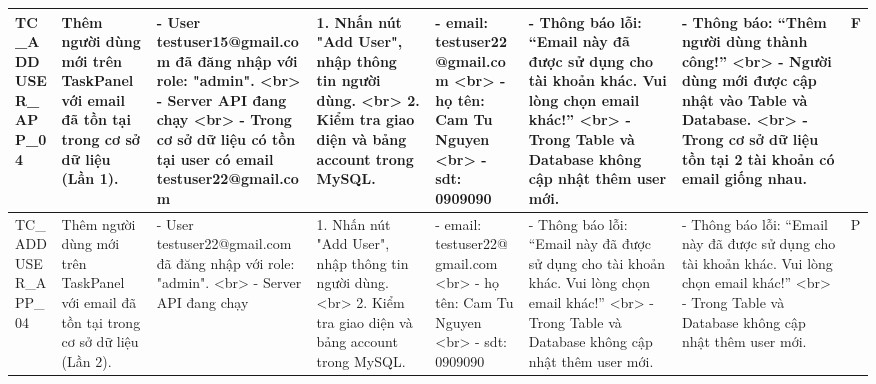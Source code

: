 \documentclass[a4paper,12pt]{article}
\begin{document}
\begin{longtable}{|p{2cm}|p{3cm}|p{3cm}|p{4cm}|p{3cm}|p{3cm}|p{3cm}|p{2cm}|}
    TC_ADDUSER_APP_04 & Thêm người dùng mới trên TaskPanel với email đã tồn tại trong cơ sở dữ liệu (Lần 1). & - User testuser15@gmail.com đã đăng nhập với role: "admin". <br> - Server API đang chạy <br> - Trong cơ sở dữ liệu có tồn tại user có email testuser22@gmail.com & 1. Nhấn nút "Add User", nhập thông tin người dùng. <br> 2. Kiểm tra giao diện và bảng account trong MySQL. & - email: testuser22@gmail.com <br> - họ tên: Cam Tu Nguyen <br> - sdt: 0909090 & - Thông báo lỗi: “Email này đã được sử dụng cho tài khoản khác. Vui lòng chọn email khác!” <br> - Trong Table và Database không cập nhật thêm user mới. & - Thông báo: “Thêm người dùng thành công!” <br> - Người dùng mới được cập nhật vào Table và Database. <br> - Trong cơ sở dữ liệu tồn tại 2 tài khoản có email giống nhau. & F \\ \hline
    TC_ADDUSER_APP_04 & Thêm người dùng mới trên TaskPanel với email đã tồn tại trong cơ sở dữ liệu (Lần 2). & - User testuser22@gmail.com đã đăng nhập với role: "admin". <br> - Server API đang chạy & 1. Nhấn nút "Add User", nhập thông tin người dùng. <br> 2. Kiểm tra giao diện và bảng account trong MySQL. & - email: testuser22@gmail.com <br> - họ tên: Cam Tu Nguyen <br> - sdt: 0909090 & - Thông báo lỗi: “Email này đã được sử dụng cho tài khoản khác. Vui lòng chọn email khác!” <br> - Trong Table và Database không cập nhật thêm user mới. & - Thông báo lỗi: “Email này đã được sử dụng cho tài khoản khác. Vui lòng chọn email khác!” <br> - Trong Table và Database không cập nhật thêm user mới. & P \\ \hline
\end{longtable}
\end{document}
